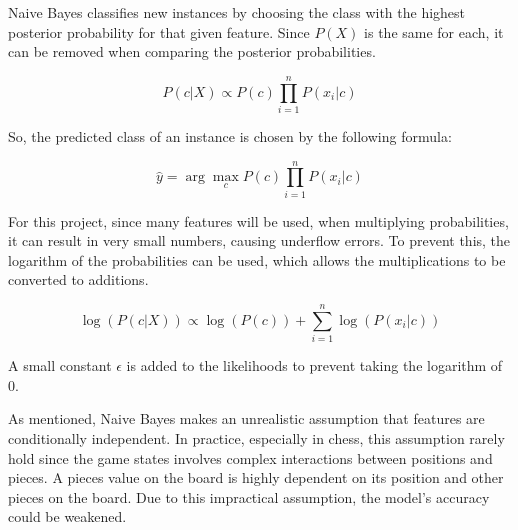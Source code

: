 Naive Bayes classifies new instances by choosing the class with the highest posterior probability for that given feature. Since $P(X)$ is the same for each, it can be removed when comparing the posterior probabilities.

\begin{equation}
    \label{eq:posterior}
    P(c | X) \propto P(c) \prod_{i=1}^{n} P(x_i | c)
\end{equation}

So, the predicted class of an instance is chosen by the following formula:

\begin{equation}
    \label{eq:prediction}
    \hat{y} = \arg\max_{c} P(c) \prod_{i=1}^{n} P(x_i | c)
\end{equation}

For this project, since many features will be used, when multiplying probabilities, it can result in very small numbers, causing underflow errors. To prevent this, the logarithm of the probabilities can be used, which allows the multiplications to be converted to additions.

\begin{equation}
    \label{eq:log}
    \log(P(c | X)) \propto \log(P(c)) + \sum_{i=1}^{n} \log(P(x_i | c))
\end{equation}

A small constant $\epsilon$ is added to the likelihoods to prevent taking the logarithm of 0.

As mentioned, Naive Bayes makes an unrealistic assumption that features are conditionally independent. In practice, especially in chess, this assumption rarely hold since the game states involves complex interactions between positions and pieces. A pieces value on the board is highly dependent on its position and other pieces on the board. Due to this impractical assumption, the model's accuracy could be 
weakened. 






